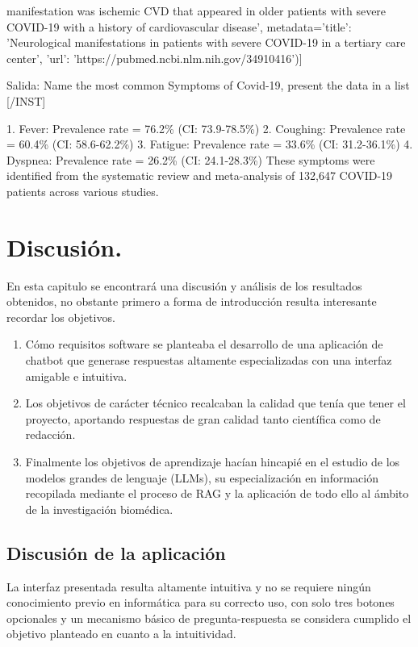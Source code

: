 manifestation was ischemic CVD that appeared in older patients with severe COVID-19 with a history of cardiovascular disease', metadata={'title': 'Neurological manifestations in patients with severe COVID-19 in a tertiary care center', 'url': 'https://pubmed.ncbi.nlm.nih.gov/34910416'})]

Salida: Name the most common Symptoms of Covid-19, present the data in a list [/INST]

1. Fever: Prevalence rate = 76.2\% (CI: 73.9-78.5\%)
2. Coughing: Prevalence rate = 60.4\% (CI: 58.6-62.2\%)
3. Fatigue: Prevalence rate = 33.6\% (CI: 31.2-36.1\%)
4. Dyspnea: Prevalence rate = 26.2\% (CI: 24.1-28.3\%)
These symptoms were identified from the systematic review and meta-analysis of 132,647 COVID-19 patients across various studies.

\section{Discusión.}

En esta capitulo se encontrará una discusión y análisis de los resultados obtenidos, no obstante primero a forma de introducción resulta interesante recordar los objetivos.

\begin{enumerate}

    \item Cómo requisitos software se planteaba el desarrollo de una aplicación de chatbot que generase respuestas altamente especializadas con una interfaz amigable e intuitiva.
    
    \item Los objetivos de carácter técnico recalcaban la calidad que tenía que tener el proyecto, aportando respuestas de gran calidad tanto científica como de redacción.
    
    \item Finalmente los objetivos de aprendizaje hacían hincapié en el estudio de los modelos grandes de lenguaje (LLMs), su especialización en información recopilada mediante el proceso de RAG y la aplicación de todo ello al ámbito de la investigación biomédica.
    
\end{enumerate}

\subsection{Discusión de la aplicación}

La interfaz presentada resulta altamente intuitiva y no se requiere ningún conocimiento previo en informática para su correcto uso, con solo tres botones opcionales y un mecanismo básico de pregunta-respuesta se considera cumplido el objetivo planteado en cuanto a la intuitividad.

